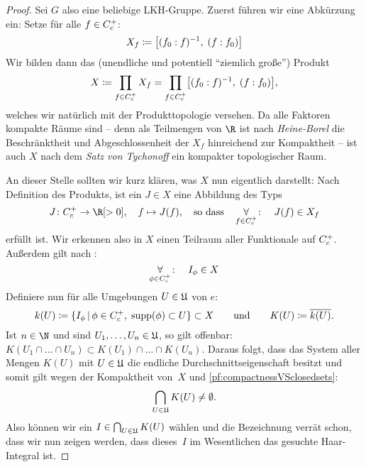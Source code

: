 \begin{proof}
    Sei $G$ also eine beliebige LKH-Gruppe. Zuerst führen wir eine Abkürzung
    ein: Setze für alle $f\in C_c^+$:
    \[ X_f \coloneqq \bigl[ (f_0 : f)^{-1}, \; (f : f_0) \bigr] \]
    Wir bilden dann das (unendliche und potentiell \enquote{ziemlich große})
    Produkt
    \[ X \coloneqq \prod_{f\in C_c^+} X_f =
        \prod_{f\in C_c^+} \bigl[ (f_0 : f)^{-1}, \; (f : f_0) \bigr]
    , \]
    welches wir natürlich mit der Produkttopologie versehen. Da alle Faktoren
    kompakte Räume sind -- denn als Teilmengen von $\R$ ist nach
    \emph{Heine-Borel} die Beschränktheit und Abgeschlossenheit der $X_f$
    hinreichend zur Kompaktheit -- ist auch $X$ nach dem \emph{Satz von
    Tychonoff} ein kompakter topologischer Raum. 
    
    An dieser Stelle sollten wir kurz klären, was $X$ nun eigentlich darstellt:
    Nach Definition des Produkts, ist ein $J\in X$ eine Abbildung des Typs
    \[  J\colon\contcompplus\to\R[>0], \quad f \mapsto J(f) ,
        \qtextq{so dass}
        \forAll_{f\in\contcompplus}\colon\quad J(f) \in X_f 
    \]
    erfüllt ist. Wir erkennen also in $X$ einen Teilraum aller Funktionale auf
    $C_c^+$.
    Außerdem gilt nach :
    \[ \operatorname*{\forall}_{\phi\in C_c^+}\colon\quad I_\phi \in X \]
    Definiere nun für alle Umgebungen $U\in\mathfrak{U}$ von $e$:
    \[  k(U) \defeq 
        \{ I_\phi \Mid \phi\in\contcompplus,\;
                                     \supp(\phi) \subset U 
        \} \subset X
        \qqundqq
        K(U) \defeq \setclosure{k(U)} 
    . \]
    Ist $n\in\N$ und sind $U_1,\ldots,U_n\in\mathfrak{U}$, so gilt offenbar:
    $K(U_1\cap \ldots \cap U_n) \subset K(U_1) \cap \ldots \cap K(U_n)$. Daraus
    folgt, dass das System aller Mengen $K(U)$ mit $U\in\mathfrak{U}$ die endliche
    Durchschnittseigenschaft besitzt und somit gilt wegen der Kompaktheit von~$X$
    und \cref{pf:compactnessVSclosedsets}: 
    \[ \bigcap_{U\in\mathfrak{U}} K(U)\neq\emptyset . \] Also können wir ein 
    $I\in\bigcap_{U\in\mathfrak{U}} K(U)$ wählen und die Bezeichnung verrät schon,
    dass wir nun zeigen werden, dass dieses~$I$ im Wesentlichen das gesuchte
    Haar-Integral ist.
    

\end{proof}
